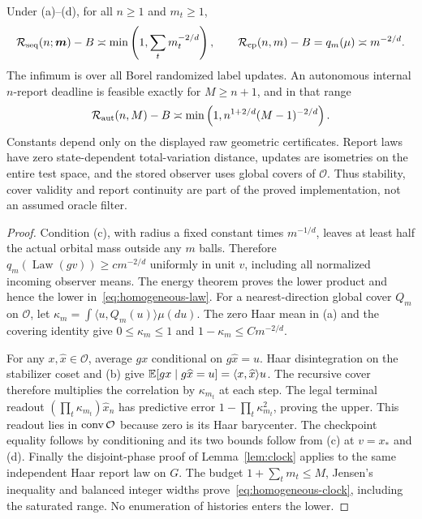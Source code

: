 \begin{theorem}\label{thm:homogeneous}
Under (a)--(d), for all $n\ge1$ and $m_t\ge1$,
\begin{equation}\label{eq:homogeneous-law}
 \mathcal R_{\rm seq}(n;\boldsymbol m)-B
 \asymp\min\left(1,\sum_t m_t^{-2/d}\right),\qquad
 \mathcal R_{\rm cp}(n,m)-B=q_m(\mu)\asymp m^{-2/d}.
\end{equation}
The infimum is over all Borel randomized label updates. An autonomous internal $n$-report deadline is feasible exactly for $M\ge n+1$, and in that range
\begin{equation}\label{eq:homogeneous-clock}
 \mathcal R_{\rm aut}(n,M)-B\asymp
 \min\left(1,n^{1+2/d}(M-1)^{-2/d}\right).
\end{equation}
Constants depend only on the displayed raw geometric certificates. Report laws have zero state-dependent total-variation distance, updates are isometries on the entire test space, and the stored observer uses global covers of $\mathcal O$. Thus stability, cover validity and report continuity are part of the proved implementation, not an assumed oracle filter.
\end{theorem}
\begin{proof}
Condition (c), with radius a fixed constant times $m^{-1/d}$, leaves at least half the actual orbital mass outside any $m$ balls. Therefore $q_m(\operatorname{Law}(gv))\ge c m^{-2/d}$ uniformly in unit $v$, including all normalized incoming observer means. The energy theorem proves the lower product and hence the lower in~\eqref{eq:homogeneous-law}. For a nearest-direction global cover $Q_m$ on $\mathcal O$, let $\kappa_m=\int\langle u,Q_m(u)\rangle\mu(du)$. The zero Haar mean in (a) and the covering identity give $0\le\kappa_m\le1$ and $1-\kappa_m\le C m^{-2/d}$.

For any $x,\widehat x\in\mathcal O$, average $gx$ conditional on $g\widehat x=u$. Haar disintegration on the stabilizer coset and (b) give
$\mathbb E[gx\mid g\widehat x=u]=\langle x,\widehat x\rangle u$.
The recursive cover therefore multiplies the correlation by $\kappa_{m_t}$ at each step. The legal terminal readout $(\prod_t\kappa_{m_t})\widehat x_n$ has predictive error $1-\prod_t\kappa_{m_t}^2$, proving the upper. This readout lies in $\operatorname{conv}\mathcal O$ because zero is its Haar barycenter. The checkpoint equality follows by conditioning and its two bounds follow from (c) at $v=x_*$ and (d). Finally the disjoint-phase proof of Lemma~\ref{lem:clock} applies to the same independent Haar report law on $G$. The budget $1+\sum_t m_t\le M$, Jensen's inequality and balanced integer widths prove~\eqref{eq:homogeneous-clock}, including the saturated range. No enumeration of histories enters the lower.
\end{proof}
